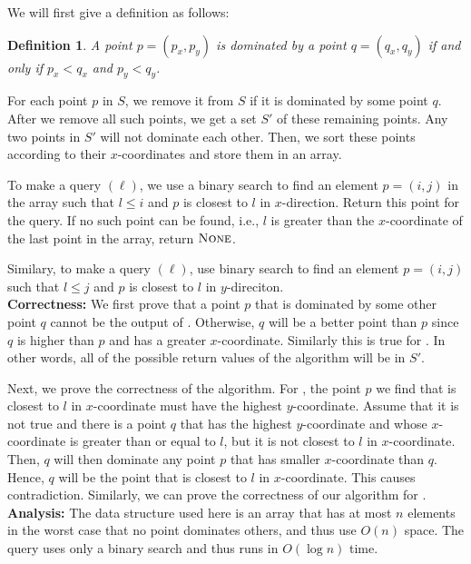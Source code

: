 \documentclass[letterpaper,11pt]{article}
\newtheorem{definition}{Definition}
\begin{document}
\begin{enumerate}
\begin{solution} 
We will first give a definition as follows:
  \begin{definition}
    A point $p=(p_x,p_y)$ is dominated by a point $q=(q_x,q_y)$ if and only if 
    $p_x<q_x$ and $p_y<q_y$.
  \end{definition}

For each point $p$ in $S$, we remove it from $S$ if it is dominated by some
point $q$.  After we remove all such points, we get a set $S'$ of these
remaining points.  Any two points in $S'$ will not dominate each other. Then,
we sort these points according to their $x$-coordinates and store them in an
array.

To make a query \HtR$(\ell)$, we use a binary
search to find an element $p=(i,j)$ in the array such that $l\leqslant i$ and
$p$ is closest to $l$ in $x$-direction. Return this point for the query. If no
such point can be found, i.e., $l$ is greater than the $x$-coordinate of the
last point in the array, return $\textsc{None}$.

Similary, to make a query \RmA$(\ell)$, use
binary search to find an element $p=(i,j)$ such that $l\leqslant j$ and $p$ is
closest to $l$ in $y$-direciton.\\

\noindent \textbf{Correctness:}
We first prove that a point $p$ that is dominated by some other point $q$
cannot be the output of \HtR.  Otherwise, $q$ will be a better point 
than $p$ since $q$ is higher than $p$ and has a greater $x$-coordinate.
Similarly this is true for \RmA. In other words, all of the possible return 
values of the algorithm will be in $S'$.

Next, we prove the correctness of the algorithm. For \HtR, the point $p$ we find
that is closest to $l$ in $x$-coordinate must have the highest $y$-coordinate.
Assume that it is not true and there is a point $q$ that has the highest
$y$-coordinate and whose $x$-coordinate is greater than or equal to $l$, but it
is not closest to $l$ in $x$-coordinate. Then, $q$ will then dominate any point
$p$ that has smaller $x$-coordinate than $q$.  Hence, $q$ will be the point 
that is closest to $l$ in $x$-coordinate. This causes contradiction.
Similarly, we can prove the correctness of our algorithm for \RmA. \markatright{\QED}\\

\noindent \textbf{Analysis:}
The data structure used here is an array that has at most $n$ elements in the 
worst case that no point dominates others, and thus use $O(n)$ space.  
The query uses only a binary search and thus runs in $O(\log{n})$ time.  
\end{solution}


\end{enumerate}
\end{document}
